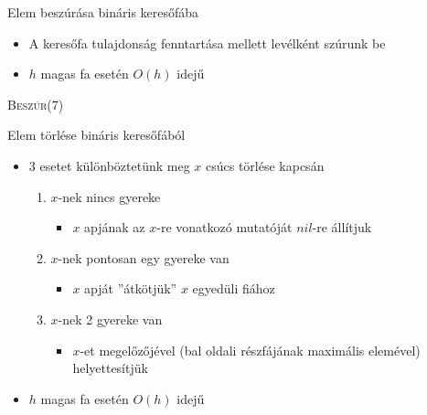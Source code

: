 \documentclass{beamer}
\begin{document}
\begin{frame}{Elem beszúrása bináris keresőfába}
  \begin{itemize}
    \item A keresőfa tulajdonság fenntartása mellett levélként szúrunk be
	\item $h$ magas fa esetén $O(h)$ idejű
  \end{itemize}
  \begin{example}
 	\begin{figure}
 	\end{figure}

 	{\scshape Beszúr(7)}

	\begin{figure}
 	\end{figure}
  \end{example}
\end{frame}

\begin{frame}{Elem törlése bináris keresőfából}
\pause
	\begin{itemize}
		\item 3 esetet különböztetünk meg $x$ csúcs törlése kapcsán
		\begin{enumerate}
			\item $x$-nek nincs gyereke
			\begin{itemize}
				\item $x$ apjának az $x$-re vonatkozó mutatóját $nil$-re állítjuk
			\end{itemize}
			\item $x$-nek pontosan egy gyereke van
			\begin{itemize}
				\item $x$ apját ''átkötjük'' $x$ egyedüli fiához
			\end{itemize}
			\item $x$-nek 2 gyereke van
			\begin{itemize}
				\item $x$-et megelőzőjével (bal oldali részfájának maximális elemével) helyettesítjük
			\end{itemize}
		\end{enumerate}
		\item $h$ magas fa esetén $O(h)$ idejű
	\end{itemize}
\end{frame}
\end{document}
